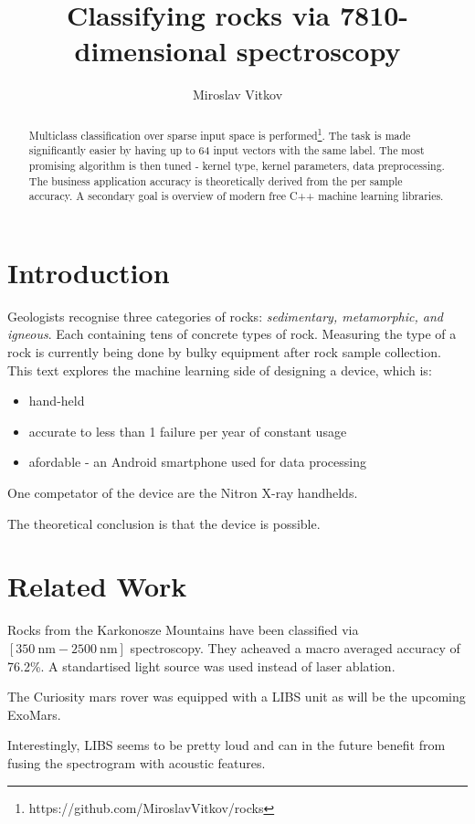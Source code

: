\documentclass{article}
\title{Classifying rocks via 7810-dimensional spectroscopy}
\author{Miroslav Vitkov}
\begin{document}
\maketitle


\begin{abstract}
Multiclass classification over sparse input space is performed\footnote{https://github.com/MiroslavVitkov/rocks}.
The task is made significantly easier by having up to 64 input vectors with the same label.
The most promising algorithm is then tuned - kernel type, kernel parameters, data preprocessing.
The business application accuracy is theoretically derived from the per sample accuracy.
A secondary goal is overview of modern free C++ machine learning libraries.
\end{abstract}


\section{Introduction}
Geologists recognise three categories of rocks: \textit{sedimentary, metamorphic, and igneous}.
Each containing tens of concrete types of rock.
Measuring the type of a rock is currently being done by bulky equipment after rock sample collection.
This text explores the machine learning side of designing a device, which is:
\begin{itemize}
\item{hand-held}
\item{accurate to less than 1 failure per year of constant usage}
\item{afordable - an Android smartphone used for data processing}
\end{itemize}
\par
One competator of the device are the Nitron X-ray handhelds\cite{nitron}.
\\
\par
The theoretical conclusion is that the device is possible.


\section{Related Work}
Rocks from the Karkonosze Mountains have been classified via $[\SI{350}{\nano\metre}-\SI{2500}{\nano\metre}]$ spectroscopy\cite{karkonosze}.
They acheaved a macro averaged accuracy of 76.2\%.
A standartised light source was used instead of laser ablation.
\par
The Curiosity mars rover was equipped with a LIBS unit\cite{curiosity} as will be the upcoming ExoMars\cite{exomars}.
\par
Interestingly, LIBS seems to be pretty loud and can in the future benefit from fusing the spectrogram with acoustic features\cite{microphone}.
\end{document}

